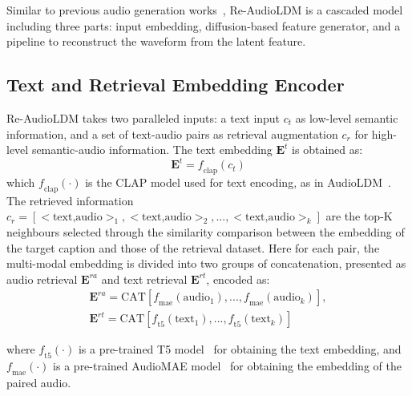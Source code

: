 \documentclass{article}
\begin{document}
Similar to previous audio generation works~\cite{audioldm,tango,tuning}, Re-AudioLDM is a cascaded model including three parts: input embedding, diffusion-based feature generator, and a pipeline to reconstruct the waveform from the latent feature. 
\subsection{Text and Retrieval Embedding Encoder}
\label{sec:encoder}
Re-AudioLDM takes two paralleled inputs: a text input $c_t$ as low-level semantic information, and a set of text-audio pairs as retrieval augmentation $c_r$ for high-level semantic-audio information. The text embedding $\boldsymbol{E}^{t}$ is obtained as: 
\begin{equation}
\label{eqa:1}
    \boldsymbol{E}^{t} = \textit{f}_{\text{clap}}(c_t)
\end{equation}
which $\textit{f}_{\text{clap}}(\cdot)$ is the CLAP model \cite{clap} used for text encoding, as in AudioLDM~\cite{audioldm}. The retrieved information $c_r =[<\text{text,audio}>_1,<\text{text,audio}>_2,...,<\text{text,audio}>_k] $ are the top-K neighbours selected through the similarity comparison between the embedding of the target caption and those of the retrieval dataset. Here for each pair, the multi-modal embedding is divided into two groups of concatenation, presented as audio retrieval $\boldsymbol{E}^{ra}$ and text retrieval $\boldsymbol{E}^{rt}$, encoded as:
\begin{align}
\label{eqa:2}
\boldsymbol{E}^{ra} = \text{CAT}[\textit{f}_{\text{mae}}(\text{audio}_1), ... , \textit{f}_{\text{mae}}(\text{audio}_k)],\\
\label{eqa:3}
\boldsymbol{E}^{rt} = \text{CAT}[\textit{f}_{\text{t5}}(\text{text}_1), ... ,\textit{f}_{\text{t5}}(\text{text}_k)]
\end{align}

\noindent
where $\textit{f}_{\text{t5}}(\cdot)$ is a pre-trained T5 model~\cite{t5} for obtaining the text embedding, and $\textit{f}_{\text{mae}}(\cdot)$ is a pre-trained AudioMAE model~\cite{mae} for obtaining the embedding of the paired audio. 
\end{document}
